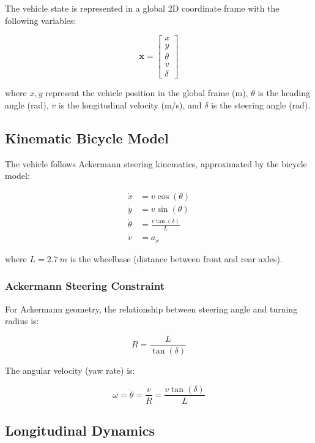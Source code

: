 \documentclass[11pt,a4paper]{article}
\begin{document}
The vehicle state is represented in a global 2D coordinate frame with the following variables:

\begin{equation}
\mathbf{x} = \begin{bmatrix} x \\ y \\ \theta \\ v \\ \delta \end{bmatrix}
\end{equation}

where $x, y$ represent the vehicle position in the global frame (m), $\theta$ is the heading angle (rad), $v$ is the longitudinal velocity (m/s), and $\delta$ is the steering angle (rad).

\subsection{Kinematic Bicycle Model}

The vehicle follows Ackermann steering kinematics, approximated by the bicycle model:

\begin{align}
\dot{x} &= v \cos(\theta) \\
\dot{y} &= v \sin(\theta) \\
\dot{\theta} &= \frac{v \tan(\delta)}{L} \\
\dot{v} &= a_x
\end{align}

where $L = \SI{2.7}{m}$ is the wheelbase (distance between front and rear axles).

\subsubsection{Ackermann Steering Constraint}

For Ackermann geometry, the relationship between steering angle and turning radius is:

\begin{equation}
R = \frac{L}{\tan(\delta)}
\end{equation}

The angular velocity (yaw rate) is:

\begin{equation}
\omega = \dot{\theta} = \frac{v}{R} = \frac{v \tan(\delta)}{L}
\end{equation}

\subsection{Longitudinal Dynamics}
\end{document}
